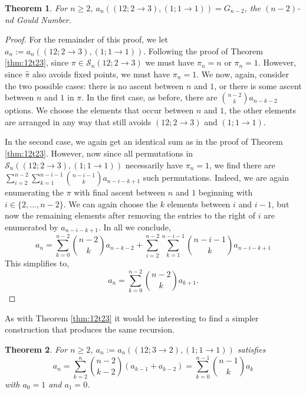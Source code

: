 \documentclass[11pt]{article}
\renewcommand\S{\mathcal S}
\newtheorem{theorem}{Theorem}[section]
\theoremstyle{definition}
\begin{document}
\begin{theorem} \label{thm:13t23t11}
    For $n \geq 2$, $a_n((12;2 \to 3), (1;1\to1)) = G_{n-2}$, the $(n-2)$-nd Gould Number.
\end{theorem}

\begin{proof}
    For the remainder of this proof, we let $a_n := a_n((12;2\to3), (1;1\to1))$. Following the proof of Theorem \ref{thm:12t23}, since $\pi \in \S_n(12;2\to3)$ we must have $\pi_n = n$ or $\pi_n = 1$. However, since $\hat\pi$ also avoids fixed points, we must have $\pi_n = 1$. We now, again, consider the two possible cases: there is no ascent between $n$ and $1$, or there is some ascent between $n$ and $1$ in $\pi$. In the first case, as before, there are $\binom{n-2}{k} a_{n-k-2}$ options. We choose the elements that occur between $n$ and $1$, the other elements are arranged in any way that still avoids $(12;2\to3)$ and $(1;1\to1)$.

    In the second case, we again get an identical sum as in the proof of Theorem \ref{thm:12t23}. However, now since all permutations in $\S_n((12;2\to3),(1;1\to1))$ necessarily have $\pi_n = 1$, we find there are $\sum_{i=2}^{n-2} \sum_{k=1}^{n-i-1} \binom{n-i-1}{k} a_{n-i-k+1}$ such permutations. Indeed, we are again enumerating the $\pi$ with final ascent between $n$ and $1$ beginning with $i \in \{2,\dots,n-2\}$. We can again choose the $k$ elements between $i$ and $i-1$, but now the remaining elements after removing the entries to the right of $i$ are enumerated by $a_{n-i-k+1}$.  In all we conclude,
    \[
    a_n = \sum_{k=0}^{n-2} \binom{n-2}{k} a_{n-k-2} + \sum_{i=2}^{n-2} \sum_{k=1}^{n-i-1} \binom{n-i-1}{k} a_{n-i-k+1}
    \]
    This simplifies to,
    \[
    a_n = \sum_{k=0}^{n-2} \binom{n-2}{k} a_{k+1}.
    \]
\end{proof}

As with Theorem \ref{thm:12t23} it would be interesting to find a simpler construction that produces the same recursion.


\begin{theorem} \label{thm:13t32t11}
    For $n \geq 2$, $a_n := a_n((12;3\to2),(1;1\to1))$ satisfies
    \[
    a_n = \sum_{k=2}^{n} \binom{n-2}{k-2}(a_{k-1}+a_{k-2}) = \sum_{k=0}^{n-1} \binom{n-1}{k} a_k 
    \]
    with $a_0 = 1$ and $a_1 = 0$.
\end{theorem}
\end{document}
